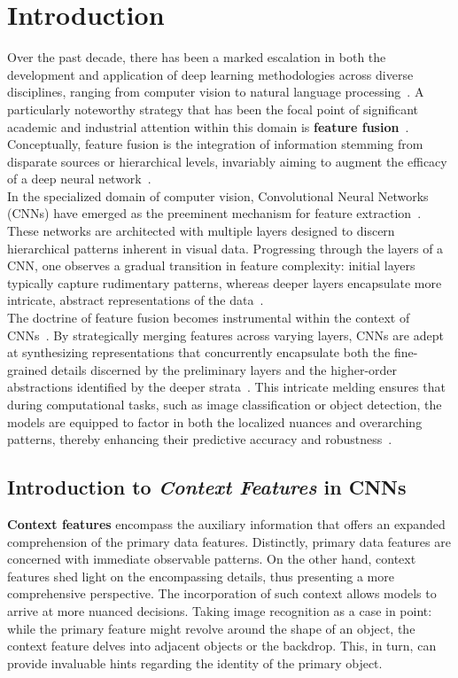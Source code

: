 \chapter{Introduction}
\label{chap:introduction}

Over the past decade, there has been a marked escalation in both the development and application of deep learning methodologies across diverse disciplines, ranging from computer vision to natural language processing~\cite{LeCun2015}. A particularly noteworthy strategy that has been the focal point of significant academic and industrial attention within this domain is \textbf{feature fusion}~\cite{rs10020299}. Conceptually, feature fusion is the integration of information stemming from disparate sources or hierarchical levels, invariably aiming to augment the efficacy of a deep neural network~\cite{7214350}.\\

In the specialized domain of computer vision, Convolutional Neural Networks (CNNs) have emerged as the preeminent mechanism for feature extraction~\cite{NIPS2012_c399862d}. These networks are architected with multiple layers designed to discern hierarchical patterns inherent in visual data. Progressing through the layers of a CNN, one observes a gradual transition in feature complexity: initial layers typically capture rudimentary patterns, whereas deeper layers encapsulate more intricate, abstract representations of the data~\cite{DBLP:journals/corr/ZeilerF13}.\\

The doctrine of feature fusion becomes instrumental within the context of CNNs~\cite{s19071599}. By strategically merging features across varying layers, CNNs are adept at synthesizing representations that concurrently encapsulate both the fine-grained details discerned by the preliminary layers and the higher-order abstractions identified by the deeper strata~\cite{8099726}. This intricate melding ensures that during computational tasks, such as image classification or object detection, the models are equipped to factor in both the localized nuances and overarching patterns, thereby enhancing their predictive accuracy and robustness~\cite{DBLP:journals/corr/Girshick15}.

\section{Introduction to \textit{Context Features} in CNNs}
\textbf{Context features} encompass the auxiliary information that offers an expanded comprehension of the primary data features. Distinctly, primary data features are concerned with immediate observable patterns. On the other hand, context features shed light on the encompassing details, thus presenting a more comprehensive perspective. The incorporation of such context allows models to arrive at more nuanced decisions. Taking image recognition as a case in point: while the primary feature might revolve around the shape of an object, the context feature delves into adjacent objects or the backdrop. This, in turn, can provide invaluable hints regarding the identity of the primary object.\\


